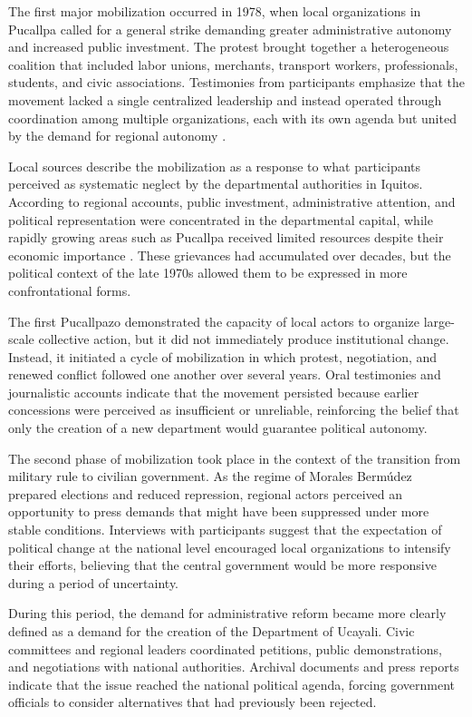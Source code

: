 \documentclass[12pt]{article}
\begin{document}
The first major mobilization occurred in 1978, when local organizations
in Pucallpa called for a general strike demanding greater administrative
autonomy and increased public investment. The protest brought together a
heterogeneous coalition that included labor unions, merchants, transport
workers, professionals, students, and civic associations. Testimonies
from participants emphasize that the movement lacked a single centralized
leadership and instead operated through coordination among multiple
organizations, each with its own agenda but united by the demand for
regional autonomy \autocite{thompson_voice_2000}.

Local sources describe the mobilization as a response to what
participants perceived as systematic neglect by the departmental
authorities in Iquitos. According to regional accounts, public
investment, administrative attention, and political representation were
concentrated in the departmental capital, while rapidly growing areas
such as Pucallpa received limited resources despite their economic
importance \autocite{vivanco_pimentel_gran_1997}. These grievances had
accumulated over decades, but the political context of the late 1970s
allowed them to be expressed in more confrontational forms.

The first Pucallpazo demonstrated the capacity of local actors to
organize large-scale collective action, but it did not immediately
produce institutional change. Instead, it initiated a cycle of
mobilization in which protest, negotiation, and renewed conflict followed
one another over several years. Oral testimonies and journalistic
accounts indicate that the movement persisted because earlier concessions
were perceived as insufficient or unreliable, reinforcing the belief that
only the creation of a new department would guarantee political autonomy.

The second phase of mobilization took place in the context of the
transition from military rule to civilian government. As the regime of
Morales Bermúdez prepared elections and reduced repression, regional
actors perceived an opportunity to press demands that might have been
suppressed under more stable conditions. Interviews with participants
suggest that the expectation of political change at the national level
encouraged local organizations to intensify their efforts, believing
that the central government would be more responsive during a period of
uncertainty.

During this period, the demand for administrative reform became more
clearly defined as a demand for the creation of the Department of
Ucayali. Civic committees and regional leaders coordinated petitions,
public demonstrations, and negotiations with national authorities.
Archival documents and press reports indicate that the issue reached the
national political agenda, forcing government officials to consider
alternatives that had previously been rejected.
\end{document}
